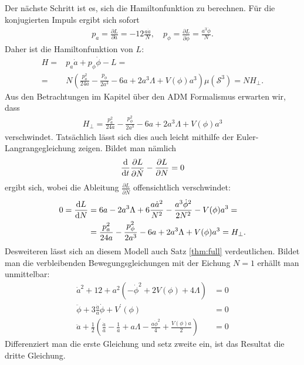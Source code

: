 \documentclass{scrartcl}
\newcommand{\VSthree}{\mu(\mathcal{S}^3)}
\begin{document}
			Der nächste Schritt ist es, sich die Hamiltonfunktion zu berechnen. Für die konjugierten Impuls ergibt sich sofort
			\begin{align}
				p_a=\frac{\partial L}{\partial \dot{a}}=-12\frac{a\dot{a}}{N},\quad p_\phi=\frac{\partial L}{\partial \dot{\phi}}=\frac{a^3\dot{\phi}}{N}.
			\end{align}
			Daher ist die Hamiltonfunktion von $L$:
			\begin{align*}
				H=&p_a \dot{a}+p_\phi \dot{\phi}-L=\\
				=&N\left(\frac{p_a^2}{24a}-\frac{p_\phi}{2a^3}-6a+2a^3\Lambda+V(\phi)a^3\right)\VSthree=N H_\perp.
			\end{align*}
			Aus den Betrachtungen im Kapitel über den ADM Formalismus erwarten wir, dass
			\begin{align*}
				H_\perp=\frac{p_a^2}{24a}-\frac{p_\phi^2}{2a^3}-6a+2a^3\Lambda+V(\phi)a^3
			\end{align*}
			verschwindet. Tatsächlich lässt sich dies auch leicht mithilfe der Euler-Langrangegleichung zeigen. Bildet man nämlich
			\begin{align*}
				\frac{{\rm d}}{{\rm d}t}\frac{\partial L}{\partial \dot{N}}-\frac{\partial L}{\partial N}=0
			\end{align*}
			ergibt sich, wobei die Ableitung $\frac{\partial L}{\partial \dot{N}}$ offensichtlich verschwindet:
			\begin{align*}
				0=\frac{{\rm d}L}{{\rm d } N}&=6a-2a^3 \Lambda+6\frac{a\dot{a}^2}{N^2}-\frac{a^3\dot{\phi}^2}{2N^2}-V(\phi)a^3=\\
				&=\frac{p_a^2}{24a}-\frac{p_\phi^2}{2a^3}-6a+2a^3\Lambda+V(\phi)a^3=H_\perp.
			\end{align*}
			Desweiteren lässt sich an diesem Modell auch Satz \ref{thm:full} verdeutlichen. Bildet man die verbleibenden Bewegungsgleichungen
			mit der Eichung $N=1$ erhällt man unmittelbar:
			\begin{align}
				\dot{a}^2+12+a^2(-\dot{\phi}^2+2V(\phi)+4\Lambda)&=0\\
				\ddot{\phi}+3\frac{\dot{a}}{a}\dot{\phi}+V^\prime(\phi)&=0\\
				\ddot{a}+\frac{1}{2}\left(\frac{\dot{a}}{a}-\frac{1}{a}+a\Lambda-\frac{a\dot{\phi}^2}{4}+\frac{V(\phi)a}{2}\right)&=0
			\end{align}
			Differenziert man die erste Gleichung und setz zweite ein, ist das Resultat die dritte Gleichung.
			
\end{document}
